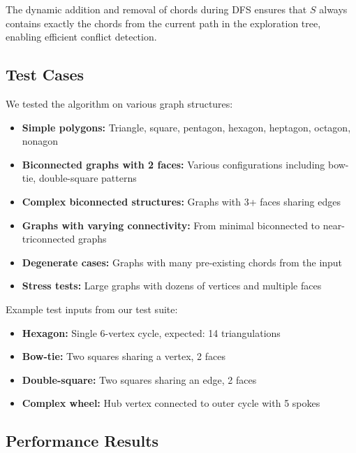 \documentclass[12pt,a4paper]{article}
\theoremstyle{definition}
\theoremstyle{remark}
\begin{document}
The dynamic addition and removal of chords during DFS ensures that $S$ always contains exactly the chords from the current path in the exploration tree, enabling efficient conflict detection.

\subsection{Test Cases}

We tested the algorithm on various graph structures:
\begin{itemize}
    \item \textbf{Simple polygons:} Triangle, square, pentagon, hexagon, heptagon, octagon, nonagon
    \item \textbf{Biconnected graphs with 2 faces:} Various configurations including bow-tie, double-square patterns
    \item \textbf{Complex biconnected structures:} Graphs with 3+ faces sharing edges
    \item \textbf{Graphs with varying connectivity:} From minimal biconnected to near-triconnected graphs
    \item \textbf{Degenerate cases:} Graphs with many pre-existing chords from the input
    \item \textbf{Stress tests:} Large graphs with dozens of vertices and multiple faces
\end{itemize}

Example test inputs from our test suite:
\begin{itemize}
    \item \textbf{Hexagon:} Single 6-vertex cycle, expected: 14 triangulations
    \item \textbf{Bow-tie:} Two squares sharing a vertex, 2 faces
    \item \textbf{Double-square:} Two squares sharing an edge, 2 faces
    \item \textbf{Complex wheel:} Hub vertex connected to outer cycle with 5 spokes
\end{itemize}

\subsection{Performance Results}
\end{document}

